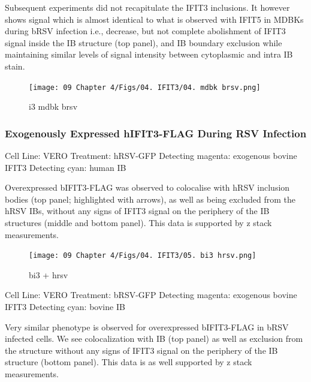 Subsequent experiments did not recapitulate the IFIT3 inclusions. It however shows signal which is almost identical to what is observed with IFIT5 in MDBKs during bRSV infection i.e., decrease, but not complete abolishment of IFIT3 signal inside the IB structure (top panel), and IB boundary exclusion while maintaining similar levels of signal intensity between cytoplasmic and intra IB stain.

\begin{figure}
    \centering
    \texttt{[image: 09 Chapter 4/Figs/04. IFIT3/04. mdbk brsv.png]}
    \caption[i3 mdbk brsv]{i3 mdbk brsv}
    \label{fig:i3 mdbk brsv}
\end{figure}


\subsubsection{Exogenously Expressed hIFIT3-FLAG During RSV Infection} \label{Exogenously Expressed hIFIT3-FLAG During RSV Infection}
Cell Line: VERO \newline
Treatment: hRSV-GFP \newline
Detecting magenta: exogenous bovine IFIT3 \newline
Detecting cyan: human IB \newline

Overexpressed bIFIT3-FLAG was observed to colocalise with hRSV inclusion bodies (top panel; highlighted with arrows), as well as being excluded from the hRSV IBs, without any signs of IFIT3 signal on the periphery of the IB structures (middle and bottom panel). This data is supported by z stack measurements.

\begin{figure}
    \centering
    \texttt{[image: 09 Chapter 4/Figs/04. IFIT3/05. bi3 hrsv.png]}
    \caption[bi3 + hrsv]{bi3 + hrsv}
    \label{fig:bi3 + hrsv}
\end{figure}

Cell Line: VERO \newline
Treatment: bRSV-GFP \newline
Detecting magenta: exogenous bovine IFIT3 \newline
Detecting cyan: bovine IB \newline

Very similar phenotype is observed for overexpressed bIFIT3-FLAG in bRSV infected cells. We see colocalization with IB (top panel) as well as exclusion from the structure without any signs of IFIT3 signal on the periphery of the IB structure (bottom panel). This data is as well supported by z stack measurements.


